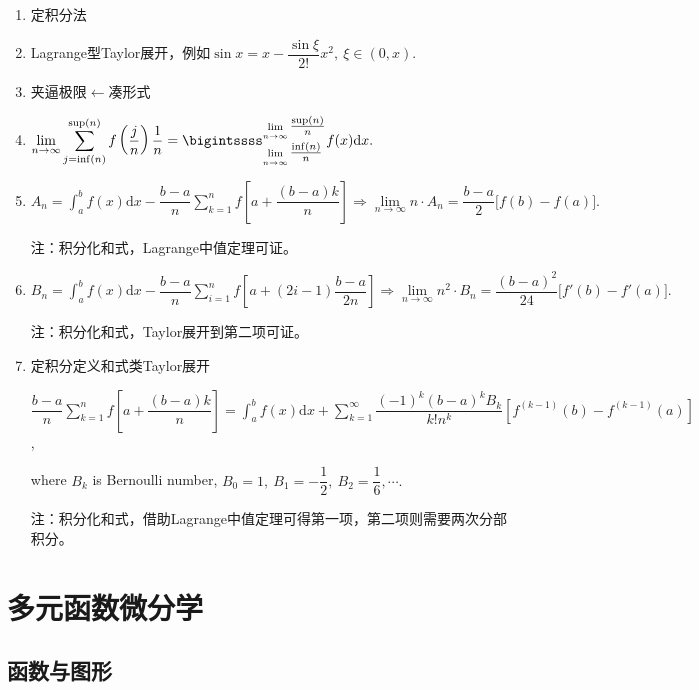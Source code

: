 \documentclass[UTF8]{ctexart}
\newcommand\dif{\mathrm{d}}
\newcommand\dis{\displaystyle}
\newcommand\limn{\dis\lim\limits_{n\to\infty}}
\newcommand\sumk{\dis\sum\limits_{k=1}^{\infty}}
\newcommand\intab{\dis\int_a^b}
\begin{document}
\begin{spacing}{2}
\begin{enumerate}[itemindent=1.4em, label=(\arabic*)]

\item 定积分法

\item Lagrange型Taylor展开，例如$\sin x=x-\dfrac{\sin\xi}{2!}x^2,\ \xi\in(0,x).$

\item 夹逼极限$\longleftarrow$凑形式

\item $\limn\sum\limits_{j=\inf(n)}^{\sup(n)}f\left(\dfrac{j}{n}\right)\dfrac{1}{n}=
\bigintssss_{\lim\limits_{n\to\infty}\tfrac{\inf(n)}{n}}
^{\lim\limits_{n\to\infty}\tfrac{\sup(n)}{n}}f(x)\dif x.$

\item $A_n=\intab f(x)\dif x-\dfrac{b-a}{n}\dis\sum\limits_{k=1}^nf\left[
a+\dfrac{(b-a)k}{n}\right]\Longrightarrow\limn n\cdot A_n=\dfrac{b-a}{2}
\big[f(b)-f(a)\big].$

注：积分化和式，Lagrange中值定理可证。

\item $B_n=\intab f(x)\dif x-\dfrac{b-a}{n}\dis\sum\limits_{i=1}^nf\left[
a+(2i-1)\dfrac{b-a}{2n}\right]\Longrightarrow\limn n^2\cdot B_n=\dfrac{(b-a)^2}{24}\big[f'(b)-f'(a)\big].$

注：积分化和式，Taylor展开到第二项可证。

\item 定积分定义和式类Taylor展开

$\dfrac{b-a}{n}\dis\sum\limits_{k=1}^nf\left[a+\dfrac{(b-a)k}{n}\right]=
\intab f(x)\dif x+\sumk\dfrac{(-1)^k(b-a)^kB_k}{k!n^k}
\left[f^{(k-1)}(b)-f^{(k-1)}(a)\right]$, 

where $B_k$ is Bernoulli number, $B_0=1,\ B_1=-\dfrac{1}{2},\ B_2=\dfrac{1}{6},\cdots.$

注：积分化和式，借助Lagrange中值定理可得第一项，第二项则需要两次分部积分。

\end{enumerate}

\newpage

\section{多元函数微分学}

\subsection{函数与图形}


\end{spacing}
\end{document}
